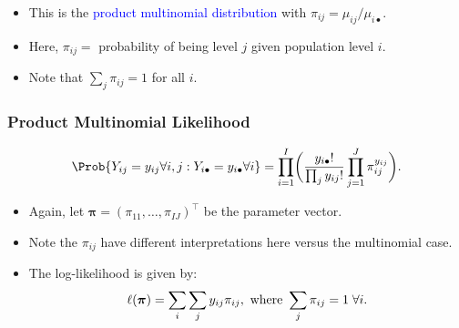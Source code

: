 \documentclass[oneside]{book}\usepackage[]{graphicx}\usepackage[svgnames]{xcolor}
\providecommand\given{} %
\renewcommand\given{\nonscript\:\delimsize\vert\nonscript\:\mathopen{}}%
\renewcommand\given{\nonscript\:\delimsize\vert\nonscript\:\mathopen{}}%
\renewcommand\given{\nonscript\:\delimsize\vert\nonscript\:\mathopen{}}%
\renewcommand\given{\nonscript\:\delimsize\vert\nonscript\:\mathopen{}}%
\renewcommand\given{\nonscript\:\delimsize\vert\nonscript\:\mathopen{}}%
\renewcommand\given{\nonscript\:\delimsize\vert\nonscript\:\mathopen{}}%
\renewcommand\given{\nonscript\:\delimsize\vert\nonscript\:\mathopen{}}%
\renewcommand\given{\nonscript\:\delimsize\vert\nonscript\:\mathopen{}}%
\renewcommand\given{\nonscript\:\delimsize\vert\nonscript\:\mathopen{}}%
\renewcommand\given{\nonscript\:\delimsize\vert\nonscript\:\mathopen{}}%
\renewcommand\given{\nonscript\:\delimsize\vert\nonscript\:\mathopen{}}%
\renewcommand\given{\nonscript\:\delimsize\vert\nonscript\:\mathopen{}}%
\let\log\relax%
\renewcommand\given{:}
\providecommand{\Vector}[1]{\bm{#1}}%
\begin{document}
\begin{itemize}
      \item This is the \textcolor{Blue}{product multinomial distribution} with $ \pi_{ij}=\mu_{ij}/\mu_{i\bullet} $.
      \item Here, $ \pi_{ij}= $ probability of being level $j$ given population level $i$.
      \item Note that $ \sum_j \pi_{ij}=1 $ for all $ i $.
\end{itemize}
\subsubsection*{Product Multinomial Likelihood}
\[ \Prob{Y_{ij}=y_{ij}\forall i,j\given Y_{i\bullet}=y_{i\bullet}\forall i}=
      \prod_{i=1}^I\biggl(\frac{y_{i\bullet}!}{\prod_j y_{ij}!}\prod_{j=1}^J \pi_{ij}^{y_{ij}}\biggr). \]
\begin{itemize}
      \item Again, let $ \Vector{\pi}=(\pi_{11},\ldots,\pi_{IJ})^\top $ be the parameter vector.
      \item Note the $ \pi_{ij} $ have different interpretations here versus the multinomial case.
      \item The log-likelihood is given by:
            \[ \ell(\Vector{\pi})=\sum_i\sum_j y_{ij}\log{\pi_{ij}},\text{ where }\sum_j \pi_{ij}=1\;\forall i. \]
\end{itemize}
\end{document}

